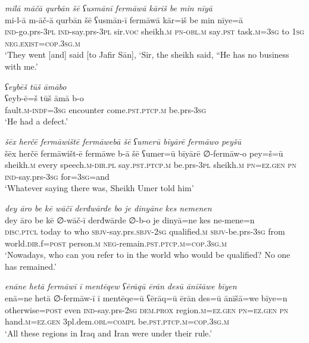 \ea \label{ŠJ.77}
\textit{milā māčā qurbān šē ʕusmānī fermāwā kāriš be min nīyā} \\ 
\gll mi-l-ā m-āč-ā qurbān šē ʕusmān-ī fermāwā kār=iš be min nīye=ā \\ 
 \textsc{ind-}go.prs\textsc{-3pl} \textsc{ind-}say.prs\textsc{-3pl} sir.\textsc{voc} sheikh\textsc{.m} \textsc{pn}\textsc{-obl}\textsc{.m} say\textsc{.pst} task\textsc{.m}\textsc{=3sg} to \textsc{1sg} \textsc{\textsc{neg.}exist}\textsc{=cop}\textsc{.3sg}\textsc{.m} \\ 
\glt `They went [and] said [to Jafir Sān], ‘Sir, the sheikh said, “He has no business with me.'
\z 
 
\ea \label{ŠJ.81}
\textit{ʕeybēš tūš āmābo} \\ 
\gll ʕeyb-ē=š tūš āmā b-o \\ 
 fault\textsc{.m}\textsc{-indf}\textsc{=3sg} encounter come\textsc{.pst}\textsc{.ptcp}\textsc{.m} be.prs\textsc{-3sg} \\ 
\glt `He had a defect.'
\z 
 
\ea \label{ŠJ.94}
\textit{šēx herčē fermāwištē fermāwebā šē ʕumerū bīyārē fermāwo peyšū} \\ 
\gll šēx herčē fermāwišt-ē fermāwe b-ā šē ʕumer=ū bīyārē ∅-fermāw-o pey=š=ū \\ 
 sheikh\textsc{.m} every speech\textsc{.m}\textsc{-dir}\textsc{.pl} say\textsc{.pst}\textsc{.ptcp}\textsc{.m} be.prs\textsc{-3pl} sheikh\textsc{.m} \textsc{pn}\textsc{=ez.gen} \textsc{pn} \textsc{ind-}say.prs\textsc{-3sg} for\textsc{=3sg}=and \\ 
\glt `Whatever saying there was, Sheikh Umer told him'
\z 
 
\ea \label{ŠJ.101}
\textit{dey āro be kē wāčī derđwārde bo je dinyāne kes nemenen} \\ 
\gll dey āro be kē ∅-wāč-ī derđwārde ∅-b-o je dinyā=ne kes ne-mene=n \\ 
 \textsc{disc.ptcl} today to who \textsc{sbjv-}say.prs.\textsc{sbjv-}\textsc{2sg} qualified\textsc{.m} \textsc{sbjv-}be.prs\textsc{-3sg} from world\textsc{.dir}.f\textsc{=\textsc{post}} person\textsc{.m} \textsc{neg-}remain\textsc{.pst}\textsc{.ptcp}\textsc{.m}\textsc{=cop}\textsc{.3sg}\textsc{.m} \\ 
\glt `Nowadays, who can you refer to in the world who would be qualified? No one has remained.'
\z 
 
\ea \label{ŠJ.102}
\textit{enāne hetā fermāwī ī mentēqew ʕērāqū ērān desū ānīšāwe bīyen} \\ 
\gll enā=ne hetā ∅-fermāw-ī ī mentēqe=ū ʕērāq=ū ērān des=ū ānīšā=we bīye=n \\ 
 otherwise\textsc{=\textsc{post}} even \textsc{ind-}say.prs-\textsc{2sg} \textsc{dem.prox} region\textsc{.m}\textsc{=ez.gen} \textsc{pn}\textsc{=ez.gen} \textsc{pn} hand\textsc{.m}\textsc{=ez.gen} 3pl.dem\textsc{.obl}\textsc{=compl} be\textsc{.pst}\textsc{.ptcp}\textsc{.m}\textsc{=cop}\textsc{.3sg}\textsc{.m} \\ 
\glt `All these regions in Iraq and Iran were under their rule.'
\z 
 
